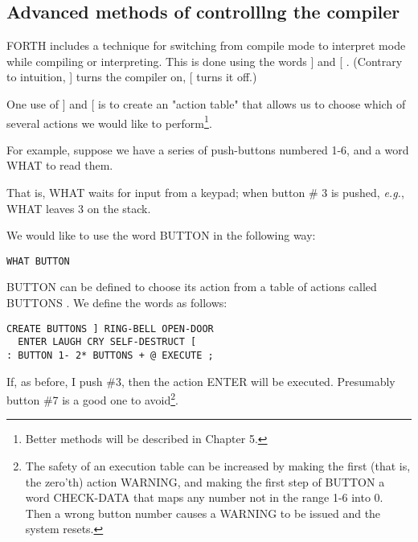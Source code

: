 \subsection{Advanced methods of controlllng the compiler}
FORTH includes a technique for switching from compile mode to interpret mode while compiling or interpreting. This is done using the words ] and [ . (Contrary to intuition, ] turns the
compiler on, [ turns it off.)

One use of ] and [ is to create an "action table" that allows us to choose which of several actions we would like to perform\footnote{Better methods will be described in Chapter 5.}.

For example, suppose we have a series of push-buttons numbered 1-6, and a word WHAT to read them.

That is, WHAT waits for input from a keypad; when button \# 3 is pushed, \textit{e.g.}, WHAT leaves 3 on the stack.

We would like to use the word BUTTON in the following way:

\begin{verbatim}
WHAT BUTTON
\end{verbatim}

BUTTON can be defined to choose its action from a table of
actions called BUTTONS . We define the words as follows:

\begin{verbatim}
CREATE BUTTONS ] RING-BELL OPEN-DOOR
  ENTER LAUGH CRY SELF-DESTRUCT [
: BUTTON 1- 2* BUTTONS + @ EXECUTE ;
\end{verbatim}

If, as before, I push \#3, then the action ENTER will be executed. Presumably button \#7 is a good one to avoid\footnote{The safety of an execution table can be increased by making the first (that is, the zero’th) action WARNING, and making the first step of BUTTON a word CHECK-DATA that maps any number not in the range 1-6 into 0. Then a wrong button number causes a WARNING to be issued and the system resets.}.

